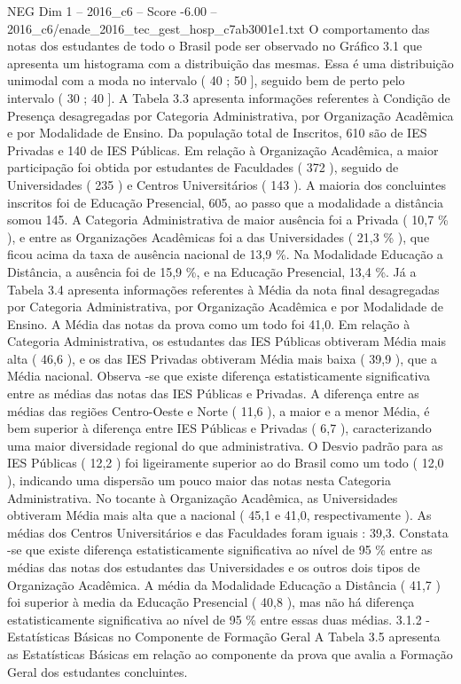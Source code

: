\begin{textsample}{NEG Dim 1 – 2016\_c6 – Score -6.00 – 2016\_c6/enade\_2016\_tec\_gest\_hosp\_c7ab3001e1.txt}
O comportamento das notas dos estudantes de todo o Brasil pode ser observado no Gráfico 3.1 que apresenta um histograma com a distribuição das mesmas.
Essa é uma distribuição unimodal com a moda no intervalo ( 40 ; 50 ], seguido bem de perto pelo intervalo ( 30 ; 40 ].
A Tabela 3.3 apresenta informações referentes à Condição de Presença desagregadas por Categoria Administrativa, por Organização Acadêmica e por Modalidade de Ensino.
Da população total de Inscritos, 610 são de IES Privadas e 140 de IES Públicas.
Em relação à Organização Acadêmica, a maior participação foi obtida por estudantes de Faculdades ( 372 ), seguido de Universidades ( 235 ) e Centros Universitários ( 143 ).
A maioria dos concluintes inscritos foi de Educação Presencial, 605, ao passo que a modalidade a distância somou 145.
A Categoria Administrativa de maior ausência foi a Privada ( 10,7 \% ), e entre as Organizações Acadêmicas foi a das Universidades ( 21,3 \% ), que ficou acima da taxa de ausência nacional de 13,9 \%.
Na Modalidade Educação a Distância, a ausência foi de 15,9 \%, e na Educação Presencial, 13,4 \%.
Já a Tabela 3.4 apresenta informações referentes à Média da nota final desagregadas por Categoria Administrativa, por Organização Acadêmica e por Modalidade de Ensino.
A Média das notas da prova como um todo foi 41,0.
Em relação à Categoria Administrativa, os estudantes das IES Públicas obtiveram Média mais alta ( 46,6 ), e os das IES Privadas obtiveram Média mais baixa ( 39,9 ), que a Média nacional.
Observa -se que existe diferença estatisticamente significativa entre as médias das notas das IES Públicas e Privadas.
A diferença entre as médias das regiões Centro-Oeste e Norte ( 11,6 ), a maior e a menor Média, é bem superior à diferença entre IES Públicas e Privadas ( 6,7 ), caracterizando uma maior diversidade regional do que administrativa.
O Desvio padrão para as IES Públicas ( 12,2 ) foi ligeiramente superior ao do Brasil como um todo ( 12,0 ), indicando uma dispersão um pouco maior das notas nesta Categoria Administrativa.
No tocante à Organização Acadêmica, as Universidades obtiveram Média mais alta que a nacional ( 45,1 e 41,0, respectivamente ).
As médias dos Centros Universitários e das Faculdades foram iguais : 39,3.
Constata -se que existe diferença estatisticamente significativa ao nível de 95 \% entre as médias das notas dos estudantes das Universidades e os outros dois tipos de Organização Acadêmica.
A média da Modalidade Educação a Distância ( 41,7 ) foi superior à media da Educação Presencial ( 40,8 ), mas não há diferença estatisticamente significativa ao nível de 95 \% entre essas duas médias. 3.1.2 - Estatísticas Básicas no Componente de Formação Geral A Tabela 3.5 apresenta as Estatísticas Básicas em relação ao componente da prova que avalia a Formação Geral dos estudantes concluintes.

\end{textsample}

